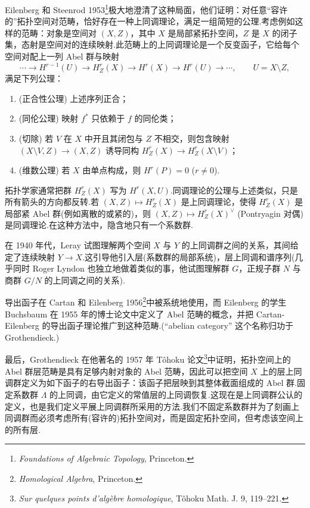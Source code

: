 Eilenberg 和 Steenrod 1953\footnote{\emph{Foundations of Algebraic Topology}, Princeton.}极大地澄清了这种局面，他们证明：对任意``容许的''拓扑空间对范畴，恰好存在一种上同调理论，满足一组简短的公理.考虑例如这样的范畴：对象是空间对 $(X, Z)$，其中 $X$ 是局部紧拓扑空间，$Z$ 是 $X$ 的闭子集，态射是空间对的连续映射.此范畴上的上同调理论是一个反变函子，它给每个空间对配上一列 Abel 群与映射
\[
\cdots \to H^{r-1}(U) \to H^{r}_{Z}(X) \to H^{r}(X) \to H^{r}(U) \to \cdots, \qquad U = X \setminus Z,
\]
满足下列公理：
\begin{enumerate}
  \item (正合性公理) 上述序列正合；
  \item (同伦公理) 映射 $f^{*}$ 只依赖于 $f$ 的同伦类；
  \item (切除) 若 $V$ 在 $X$ 中开且其闭包与 $Z$ 不相交，则包含映射 $(X \setminus V, Z) \to (X, Z)$ 诱导同构 $H^{r}_{Z}(X) \to H^{r}_{Z}(X \setminus V)$；
  \item (维数公理) 若 $X$ 由单点构成，则 $H^{r}(P) = 0$ ($r \neq 0$).
\end{enumerate}
拓扑学家通常把群 $H^{r}_{Z}(X)$ 写为 $H^{r}(X, U)$.同调理论的公理与上述类似，只是所有箭头的方向都反转.若 $(X, Z) \mapsto H^{r}_{Z}(X)$ 是上同调理论，使得 $H^{r}_{Z}(X)$ 是局部紧 Abel 群(例如离散的或紧的)，则 $(X, Z) \mapsto H^{r}_{Z}(X)^{\vee}$ (Pontryagin 对偶)是同调理论.在这种方法中，隐含地只有一个系数群.

在 1940 年代，Leray 试图理解两个空间 $X$ 与 $Y$ 的上同调群之间的关系，其间给定了连续映射 $Y \to X$.这引导他引入层(系数群的局部系统)，层上同调和谱序列(几乎同时 Roger Lyndon 也独立地做着类似的事，他试图理解群 $G$，正规子群 $N$ 与商群 $G/N$ 的上同调之间的关系).

导出函子在 Cartan 和 Eilenberg 1956\footnote{\emph{Homological Algebra}, Princeton.}中被系统地使用，而 Eilenberg 的学生 Buchsbaum 在 1955 年的博士论文中定义了 Abel 范畴的概念，并把 Cartan-Eilenberg 的导出函子理论推广到这种范畴.(``abelian category'' 这个名称归功于 Grothendieck.)

最后，Grothendieck 在他著名的 1957 年 T\^ohoku 论文\footnote{\emph{Sur quelques points d'alg\`ebre homologique}, T\^ohoku Math. J. 9, 119--221.}中证明，拓扑空间上的 Abel 群层范畴是具有足够内射对象的 Abel 范畴，因此可以把空间 $X$ 上的层上同调群定义为如下函子的右导出函子：该函子把层映到其整体截面组成的 Abel 群.固定系数群 $\Lambda$ 的上同调，由它定义的常值层的上同调恢复.这现在是上同调群公认的定义，也是我们定义平展上同调群所采用的方法.我们不固定系数群并为了刻画上同调群而必须考虑所有(容许的)拓扑空间对，而是固定拓扑空间，但考虑该空间上的所有层.

